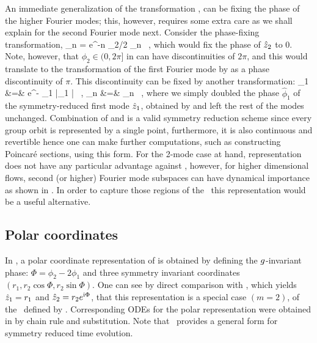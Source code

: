 An immediate generalization of the transformation ,
can be fixing the phase of the higher Fourier modes; this, however, requires
some extra care as we shall explain for the second Fourier mode next.
Consider the phase-fixing transformation,
\beq
	\sspRedC_n = e^{-\ii n \phi_2/2} \sspC_n \, ,
	\label{e-2ndmodeTransform}
\eeq
which would fix the phase of $\hat{z}_2$ to $0$. Note, however, that
$\phi_2 \in (0, 2 \pi]$ in can have discontinuities of $2 \pi$, and this
would translate to the transformation of the first Fourier mode by 
as a phase discontinuity of $\pi$. This discontinuity can be fixed by another
transformation:
\bea
	\tilde{\sspC}_1 &=& e^{- \hat{\phi}_1} |\sspRedC_1 | \, , \continue
	\tilde{\sspC}_{n } &=& \sspRedC_n \, ,
	\label{e-PhaseDoubling}
\eea
where we simply doubled the phase $\hat{\phi}_1$ of the symmetry-reduced
first mode $\hat{z}_1$, obtained by  and left
the rest of the modes unchanged. Combination of 
and  is a valid symmetry reduction scheme since every
group orbit is represented by a single point, furthermore, it is also continuous
and revertible hence one can make further computations, such as constructing
Poincar\'{e} sections, using this form. For the 2-mode case at hand, representation
 does not have any particular advantage against
, however, for higher dimensional flows, second
(or higher) Fourier mode subspaces can have dynamical importance as shown in
. In order to capture those regions of the \statesp\ this
representation would be a useful alternative.

\subsection{Polar coordinates}
\label{s-polar}

In , a polar coordinate representation of 
is obtained by defining the $g$-invariant phase: $\Phi = \phi_2 - 2 \phi_1$
and three symmetry invariant coordinates $(r_1, r_2 \cos \Phi, r_2 \sin \Phi)$.
One can see by direct comparison with , which
yields $\hat{z}_1 = r_1$ and $\hat{z}_2 = r_2 e^{\mathrm{i} \Phi}$, that this
representation is a special case $(m=2)$, of the \slice\ defined by
. Corresponding ODEs for the polar representation
were obtained in  by  chain rule and substitution. Note
that \mslices\ provides a general form  for symmetry
reduced time evolution.
